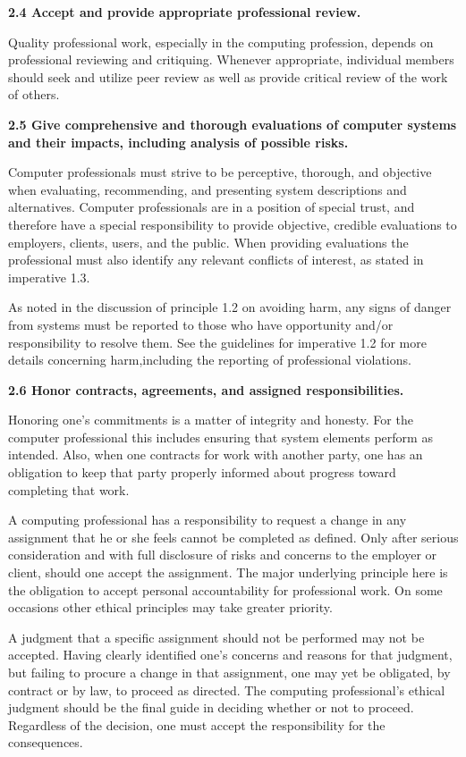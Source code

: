 \vspace{.1in}\noindent\textbf{2.4 Accept and provide appropriate professional review.}

Quality professional work, especially in the computing profession, depends on professional reviewing and critiquing. Whenever appropriate, individual members should seek and utilize peer review as well as provide critical review of the work of others.

\vspace{.1in}\noindent\textbf{2.5 Give comprehensive and thorough evaluations of computer systems and their impacts, including analysis of possible risks.}

Computer professionals must strive to be perceptive, thorough, and objective when evaluating, recommending, and presenting system descriptions and alternatives. Computer professionals are in a position of special trust, and therefore have a special responsibility to provide objective, credible evaluations to employers, clients, users, and the public. When providing evaluations the professional must also identify any relevant conflicts of interest, as stated in imperative 1.3.

As noted in the discussion of principle 1.2 on avoiding harm, any signs of danger from systems must be reported to those who have opportunity and/or responsibility to resolve them. See the guidelines for imperative 1.2 for more details concerning harm,including the reporting of professional violations.

\vspace{.1in}\noindent\textbf{2.6 Honor contracts, agreements, and assigned responsibilities.}

Honoring one's commitments is a matter of integrity and honesty. For the computer professional this includes ensuring that system elements perform as intended. Also, when one contracts for work with another party, one has an obligation to keep that party properly informed about progress toward completing that work.

A computing professional has a responsibility to request a change in any assignment that he or she feels cannot be completed as defined. Only after serious consideration and with full disclosure of risks and concerns to the employer or client, should one accept the assignment. The major underlying principle here is the obligation to accept personal accountability for professional work. On some occasions other ethical principles may take greater priority.

A judgment that a specific assignment should not be performed may not be accepted. Having clearly identified one's concerns and reasons for that judgment, but failing to procure a change in that assignment, one may yet be obligated, by contract or by law, to proceed as directed. The computing professional's ethical judgment should be the final guide in deciding whether or not to proceed. Regardless of the decision, one must accept the responsibility for the consequences.

